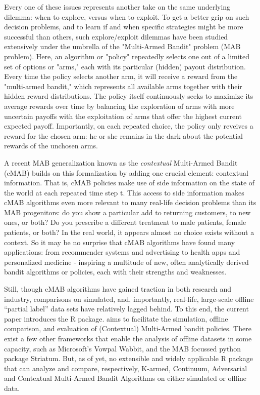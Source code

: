 \documentclass[nojss]{jss}\usepackage[]{graphicx}\usepackage[]{color}
\begin{document}
Every one of these issues represents another take on the same underlying dilemma: when to explore, versus when to exploit. To get a better grip on such decision problems, and to learn if and when specific strategies might be more successful than others, such explore/exploit dilemmas have been studied extensively under the umbrella of the "Multi-Armed Bandit" problem (MAB problem). Here, an algorithm or "policy" repeatedly selects one out of a limited set of options or "arms," each with its particular (hidden) payout distribution. Every time the policy selects another arm, it will receive a reward from the "multi-armed bandit," which represents all available arms together with their hidden reward distributions. The policy itself continuously seeks to maximize its average rewards over time by balancing the exploration of arms with more uncertain payoffs with the exploitation of arms that offer the highest current expected payoff. Importantly, on each repeated choice, the policy only reveives a reward for the chosen arm: he or she remains in the dark about the potential rewards of the unchosen arms.

A recent MAB generalization known as the \textit{contextual} Multi-Armed Bandit (cMAB) builds on this formalization by adding one crucial element: contextual information. That is, cMAB policies make use of side information on the state of the world at each repeated time step t. This access to side information makes cMAB algorithms even more relevant to many real-life decision problems than its MAB progenitors: do you show a particular add to returning customers, to new ones, or both? Do you prescribe a different treatment to male patients, female patients, or both? In the real world, it appears almost no choice exists without a context. So it may be no surprise that cMAB algorithms have found many applications: from recommender systems and advertising to health apps and personalized medicine - inspiring a multitude of new, often analytically derived bandit algorithms or policies, each with their strengths and weaknesses.

Still, though cMAB algorithms have gained traction in both research and industry, comparisons on simulated, and, importantly, real-life, large-scale offline \textquotedblleft{}partial label\textquotedblright{} data sets have relatively lagged behind. To this end, the current paper introduces the  R package.  aims to facilitate the simulation, offline comparison, and evaluation of (Contextual) Multi-Armed bandit policies. There exist a few other frameworks that enable the analysis of offline datasets in some capacity, such as Microsoft's Vowpal Wabbit, and the MAB focussed python package Striatum. But, as of yet, no extensible and widely applicable R package that can analyze and compare, respectively, K-armed, Continuum, Adversarial and Contextual Multi-Armed Bandit Algorithms on either simulated or offline data.
\end{document}
